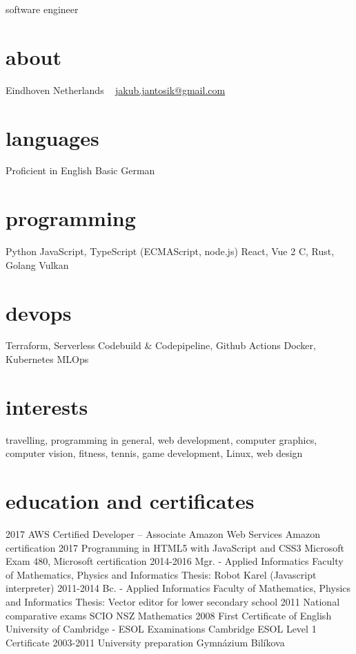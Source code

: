 \documentclass[]{friggeri-cv}
\begin{document}
{software engineer}

\begin{aside}
  \section{about}
  Eindhoven
  Netherlands
  ~
  \href{mailto:jakub.jantosik@gmail.com}{jakub.jantosik@gmail.com}
  \section{languages}
  Proficient in English
  Basic German
  \section{programming}
  Python
  JavaScript, TypeScript
  (ECMAScript, node.js)
  React, Vue 2
  C, Rust, Golang
  Vulkan
  \section{devops}
  Terraform, Serverless
  Codebuild \& Codepipeline, Github Actions
  Docker, Kubernetes
  MLOps
\end{aside}

\section{interests}

travelling, programming in general, web development, computer graphics, computer vision, fitness, tennis, game development, Linux,  web design

\section{education and certificates}

\begin{entrylist}
  \entry
  {2017}
  {AWS Certified Developer – Associate}
  {Amazon Web Services}
  {Amazon certification}
  \entry
  {2017}
  {Programming in HTML5 with JavaScript and CSS3}
  {Microsoft}
  {Exam 480, Microsoft certification}
  \entry
  {2014-2016}
  {Mgr. - Applied Informatics}
  {Faculty of Mathematics, Physics and Informatics}
  {Thesis: Robot Karel (Javascript interpreter)}
  \entry
  {2011-2014}
  {Bc. - Applied Informatics}
  {Faculty of Mathematics, Physics and Informatics}
  {Thesis: Vector editor for lower secondary school}
  \entry
  {2011}
  {National comparative exams}
  {SCIO}
  {NSZ Mathematics}
  \entry
  {2008}
  {First Certificate of English}
  {University of Cambridge - ESOL Examinations}
  {Cambridge ESOL Level 1 Certificate}
  \entry
  {2003-2011}
  {University preparation}
  {Gymnázium Bilíkova}
  {}
\end{entrylist}
\end{document}
